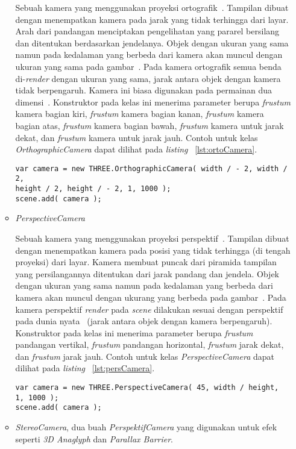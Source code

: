 \begin{itemize}
\begin{itemize}
		Sebuah kamera yang menggunakan proyeksi ortografik~\cite{threejs}. Tampilan dibuat dengan menempatkan kamera pada jarak yang tidak terhingga dari layar. Arah dari pandangan menciptakan pengelihatan yang pararel bersilang dan ditentukan berdasarkan jendelanya. Objek dengan ukuran yang sama namun pada kedalaman yang berbeda dari kamera akan muncul dengan ukuran yang sama pada gambar~\cite{siggraph}. Pada kamera ortografik semua benda di-{\it render} dengan ukuran yang sama, jarak antara objek dengan kamera tidak berpengaruh. Kamera ini biasa digunakan pada permainan dua dimensi~\cite{learningThreejs}. 
		Konstruktor pada kelas ini menerima parameter berupa {\it frustum} kamera bagian kiri, {\it frustum} kamera bagian kanan, {\it frustum} kamera bagian atas, {\it frustum} kamera bagian bawah, {\it frustum} kamera untuk jarak dekat, dan {\it frustum} kamera untuk jarak jauh. Contoh untuk kelas {\it OrthographicCamera} dapat dilihat pada {\it listing} ~\ref{lst:ortoCamera}.
\begin{lstlisting}[caption={Contoh instansiasi kelas {\it OrthographicCamera}}, label={lst:ortoCamera},captionpos=b]
var camera = new THREE.OrthographicCamera( width / - 2, width / 2, 
height / 2, height / - 2, 1, 1000 );
scene.add( camera );
\end{lstlisting}
		\item {\it PerspectiveCamera}
		
		Sebuah kamera yang menggunakan proyeksi perspektif~\cite{threejs}. Tampilan dibuat dengan menempatkan kamera pada posisi yang tidak terhingga (di tengah proyeksi) dari layar. Kamera membuat puncak dari piramida tampilan yang persilangannya ditentukan dari jarak pandang dan jendela. Objek dengan ukuran yang sama namun pada kedalaman yang berbeda dari kamera akan muncul dengan ukurang yang berbeda pada gambar~\cite{siggraph}. Pada kamera perspektif {\it render} pada {\it scene} dilakukan sesuai dengan perspektif pada dunia nyata~\cite{learningThreejs} (jarak antara objek dengan kamera berpengaruh).
		Konstruktor pada kelas ini menerima parameter berupa {\it frustum} pandangan vertikal, {\it frustum} pandangan horizontal, {\it frustum} jarak dekat, dan {\it frustum} jarak jauh. Contoh untuk kelas {\it PerspectiveCamera} dapat dilihat pada {\it listing} ~\ref{lst:persCamera}.
\begin{lstlisting}[caption={Contoh instansiasi kelas {\it PerspectiveCamera}}, label={lst:persCamera},captionpos=b]
var camera = new THREE.PerspectiveCamera( 45, width / height, 
1, 1000 );
scene.add( camera );
\end{lstlisting}
		\item {\it StereoCamera}, dua buah {\it PerspektifCamera} yang digunakan untuk efek seperti {\it 3D Anaglyph} dan {\it Parallax Barrier}.
	\end{itemize}
	

\end{itemize}
